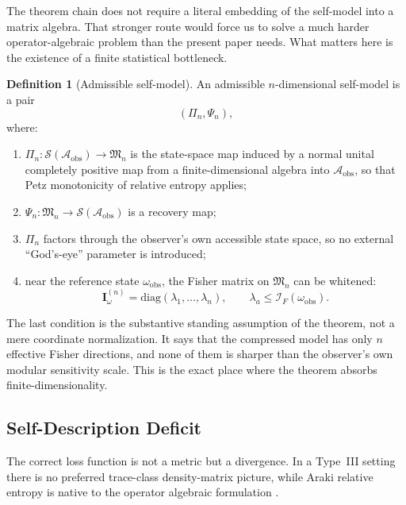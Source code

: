 \documentclass[12pt]{article}
\theoremstyle{definition}
\newtheorem{definition}[theorem]{Definition}
\theoremstyle{remark}
\begin{document}
The theorem chain does not require a literal embedding of the self-model
into a matrix algebra. That stronger route would force us to solve a
much harder operator-algebraic problem than the present paper needs.
What matters here is the existence of a finite statistical bottleneck.

\begin{definition}[Admissible self-model]\label{def:2.2}
An admissible \(n\)-dimensional self-model is a pair
\[
(\Pi_n,\Psi_n),
\]
where:
\begin{enumerate}
\item \(\Pi_n:\mathcal{S}(\mathcal{A}_{\mathrm{obs}})\to
\mathfrak{M}_n\) is the state-space map induced by a normal unital
completely positive map from a finite-dimensional algebra into
\(\mathcal{A}_{\mathrm{obs}}\), so that Petz monotonicity of relative
entropy applies;
\item \(\Psi_n:\mathfrak{M}_n\to
\mathcal{S}(\mathcal{A}_{\mathrm{obs}})\) is a recovery map;
\item \(\Pi_n\) factors through the observer's own accessible state
space, so no external ``God's-eye'' parameter is introduced;
\item near the reference state \(\omega_{\mathrm{obs}}\), the Fisher
matrix on \(\mathfrak{M}_n\) can be whitened:
\[
\mathbf{I}^{(n)}_\omega
=
\mathrm{diag}(\lambda_1,\dots,\lambda_n),
\qquad
\lambda_a \leq \mathcal{I}_F(\omega_{\mathrm{obs}}).
\]
\end{enumerate}
\end{definition}

The last condition is the substantive standing assumption of the
theorem, not a mere coordinate normalization. It says that the
compressed model has only \(n\) effective Fisher directions, and none of
them is sharper than the observer's own modular sensitivity scale. This
is the exact place where the theorem absorbs finite-dimensionality.

\subsection{Self-Description Deficit}\label{subsec:2.3}

The correct loss function is not a metric but a divergence. In a
Type~III setting there is no preferred trace-class density-matrix
picture, while Araki relative entropy is native to the operator
algebraic formulation \cite{Araki1976}.
\end{document}
